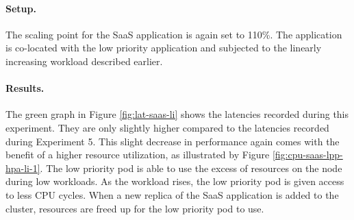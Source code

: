 \paragraph{Setup.}
The scaling point for the SaaS application is again set to 110\%. The application is co-located with the low priority application and subjected to the linearly increasing workload described earlier.


\paragraph{Results.}
The green graph in Figure \ref{fig:lat-saas-li} shows the latencies recorded during this experiment. They are only slightly higher compared to the latencies recorded during Experiment 5. This slight decrease in performance again comes with the benefit of a higher resource utilization, as illustrated by Figure \ref{fig:cpu-saas-lpp-hpa-li-1}. The low priority pod is able to use the excess of resources on the node during low workloads. As the workload rises, the low priority pod is given access to less CPU cycles. When a new replica of the SaaS application is added to the cluster, resources are freed up for the low priority pod to use. 

